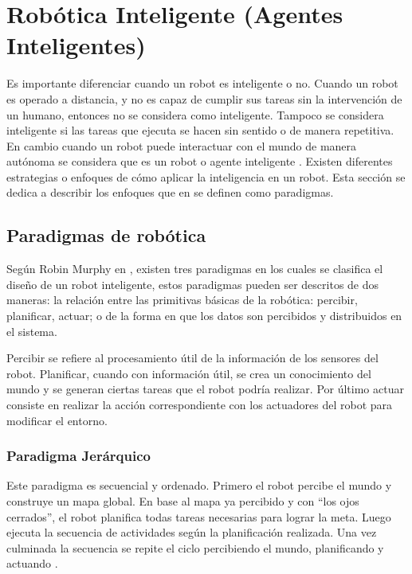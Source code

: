 \section{Robótica Inteligente (Agentes Inteligentes)} \label{sect:AgentesInteligentes}

Es importante diferenciar cuando un robot es inteligente o no. Cuando un robot es operado a distancia, y no es capaz de cumplir sus tareas sin la intervención de un humano, entonces no se considera como inteligente. Tampoco se considera inteligente si las tareas que ejecuta se hacen sin sentido o de manera repetitiva. En cambio cuando un robot puede interactuar con el mundo de manera autónoma se considera que es un robot o agente inteligente \cite{AiRobotics}. Existen diferentes estrategias o enfoques de cómo aplicar la inteligencia en un robot. Esta sección se dedica a describir los enfoques que en  \cite{AiRobotics} se definen como paradigmas.   
   
\subsection{Paradigmas de robótica}
Según Robin Murphy en \cite{AiRobotics}, existen tres paradigmas en los cuales se clasifica el diseño de un robot inteligente, estos paradigmas pueden ser descritos de dos maneras: la relación entre las primitivas básicas de la robótica:  percibir, planificar, actuar; o de la forma en que los datos son percibidos y distribuidos en el sistema.

Percibir se refiere al procesamiento útil de la información de los sensores del robot. Planificar, cuando con información útil, se crea un conocimiento del mundo y se generan ciertas tareas que el robot podría realizar. Por último actuar consiste en realizar la acción correspondiente con los actuadores del robot para modificar el entorno. 

\subsubsection{ Paradigma Jerárquico}

Este paradigma es secuencial y ordenado. Primero el robot percibe el mundo y construye un mapa global. En base al mapa ya percibido y con “los ojos cerrados”, el robot planifica todas tareas necesarias para lograr la meta. Luego ejecuta la secuencia de actividades según la planificación realizada. Una vez culminada la secuencia se repite el ciclo percibiendo el mundo, planificando y actuando \cite{AiRobotics}.

